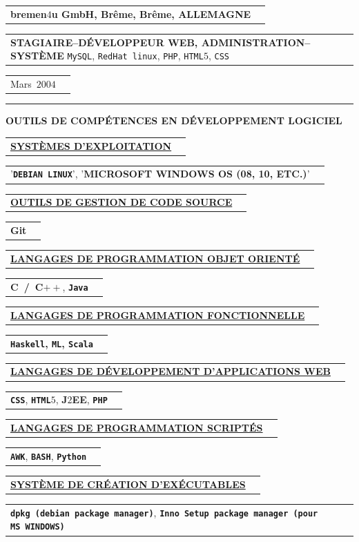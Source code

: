 \documentclass[9pt,a4paper]{article} %
\makeatletter
\newcommand{\headerrow}[2]
{\begin{tabular*}{\linewidth}{l@{\extracolsep{\fill}}r}
	#1 &
	#2 \\
\end{tabular*}}
\newcommand{\headerrowONE}[1]{\headerrow{#1}{}}
\newcommand{\git}{Git\xspace}
\newcommand{\cplusplus}{C$++$\xspace}
\newcommand{\java}{\texttt{Java}\xspace}
\newcommand{\css}{\texttt{CSS}\xspace}
\newcommand{\html}{\texttt{HTML$5$}\xspace}
\newcommand{\jtwoee}{J$2$EE\xspace}
\newcommand{\php}{\texttt{PHP}\xspace}
\newcommand{\dpkgmanager}{\texttt{dpkg (debian package manager)}\xspace}
\newcommand{\innosetuppackagemanager}{\texttt{Inno Setup package manager (pour MS~WINDOWS)}\xspace}
\newcommand{\AWK}{\texttt{AWK}\xspace}
\newcommand{\bash}{\texttt{BASH}\xspace}
\newcommand{\python}{\texttt{Python}\xspace}
\newcommand{\scala}{\texttt{Scala}\xspace}
\newcommand{\haskell}{\texttt{Haskell}\xspace}
\newcommand{\ml}{\texttt{ML}\xspace}
\newcommand{\mysql}{\texttt{MySQL}\xspace}
\newcommand{\yerothdebian}{\texttt{DEBIAN LINUX}\xspace}
\newcommand{\redhat}{\texttt{RedHat~linux}\xspace}
\newcommand{\cvitemdate}[2]{#1~$#2$\xspace}
\newcommand{\cvitempositionheld}[1]{\textbf{#1}\xspace}
\makeatother
\begin{document}
\vspace{0.3em}

\headerrowONE{\textbf{bremen$4$u GmbH, Brême, Brême, ALLEMAGNE}}	
\headerrowONE{\cvitempositionheld{STAGIAIRE--DÉVELOPPEUR WEB, ADMINISTRATION--SYSTÈME} \mysql, \redhat, \php,
\html, \css}
\headerrowONE{\cvitemdate{Mars}{2004}}	

\vspace{1em}


\hrule

\begin{center}
{\large \textbf{OUTILS DE COMPÉTENCES EN DÉVELOPPEMENT LOGICIEL}}
\end{center}

\vspace{0.5em}

\headerrowONE{\textbf{\underline{SYSTÈMES D'EXPLOITATION}}}
\headerrowONE{'\textbf{\yerothdebian}', '\textbf{MICROSOFT WINDOWS OS (08, 10, ETC.)}'}

\vspace{0.3em}

\headerrowONE{\textbf{\underline{OUTILS DE GESTION DE CODE SOURCE}}}
\headerrowONE{\textbf{\git}}

\vspace{0.3em}

\headerrowONE{\textbf{\underline{LANGAGES DE PROGRAMMATION OBJET ORIENTÉ}}}
\headerrowONE{\textbf{C~/~\cplusplus}, \textbf{\java}}

\vspace{0.3em}

\headerrowONE{\textbf{\underline{LANGAGES DE PROGRAMMATION FONCTIONNELLE}}}
\headerrowONE{\textbf{\textbf{\haskell}, \textbf{\ml}, \scala}}

\vspace{0.3em}

\headerrowONE{\textbf{\underline{LANGAGES DE DÉVELOPPEMENT D'APPLICATIONS WEB}}}
\headerrowONE{\textbf{\css}, \textbf{\html}, \textbf{\jtwoee}, \textbf{\php}}

\vspace{0.3em}

\headerrowONE{\textbf{\underline{LANGAGES DE PROGRAMMATION SCRIPTÉS}}}
\headerrowONE{\textbf{\AWK}, \textbf{\bash}, \textbf{\python}}

\vspace{0.3em}

\headerrowONE{\textbf{\underline{SYSTÈME DE CRÉATION D'EXÉCUTABLES}}}
\headerrowONE{\textbf{\dpkgmanager}, \textbf{\innosetuppackagemanager}}
\end{document}
